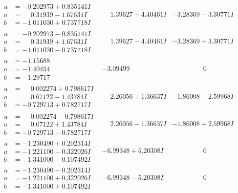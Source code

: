 \documentclass[1p]{elsarticle_modified}
\theoremstyle{definition}
\begin{document}
$$\begin{array}{c|c|c}
\begin{aligned}
u &= -0.202973 + 0.835141 I \\
a &= \phantom{-}0.31939 - 1.67631 I \\
b &= -1.011030 + 0.737718 I\end{aligned}
 & \phantom{-}1.39627 + 4.40461 I & -3.28369 - 3.30771 I \\ \hline\begin{aligned}
u &= -0.202973 - 0.835141 I \\
a &= \phantom{-}0.31939 + 1.67631 I \\
b &= -1.011030 - 0.737718 I\end{aligned}
 & \phantom{-}1.39627 - 4.40461 I & -3.28369 + 3.30771 I \\ \hline\begin{aligned}
u &= -1.15688\phantom{ +0.000000I} \\
a &= -1.40454\phantom{ +0.000000I} \\
b &= -1.29717\phantom{ +0.000000I}\end{aligned}
 & -3.09499\phantom{ +0.000000I} & \phantom{-0.000000 } 0 \\ \hline\begin{aligned}
u &= \phantom{-}0.002274 + 0.798617 I \\
a &= \phantom{-}0.67122 - 1.43784 I \\
b &= -0.729713 + 0.782717 I\end{aligned}
 & \phantom{-}2.26056 + 1.36637 I & -1.86008 - 2.59968 I \\ \hline\begin{aligned}
u &= \phantom{-}0.002274 - 0.798617 I \\
a &= \phantom{-}0.67122 + 1.43784 I \\
b &= -0.729713 - 0.782717 I\end{aligned}
 & \phantom{-}2.26056 - 1.36637 I & -1.86008 + 2.59968 I \\ \hline\begin{aligned}
u &= -1.230490 + 0.202314 I \\
a &= -1.221100 - 0.322026 I \\
b &= -1.341000 - 0.107492 I\end{aligned}
 & -6.99348 + 5.20308 I & \phantom{-0.000000 } 0 \\ \hline\begin{aligned}
u &= -1.230490 - 0.202314 I \\
a &= -1.221100 + 0.322026 I \\
b &= -1.341000 + 0.107492 I\end{aligned}
 & -6.99348 - 5.20308 I & \phantom{-0.000000 } 0 \\ \hline\begin{aligned}

\end{aligned}
\end{array}$$
\end{document}

